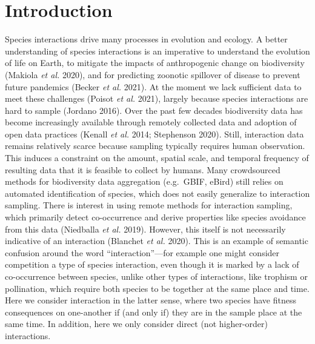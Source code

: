 \documentclass[11pt]{article}
\begin{document}
\vfill

\clearpage
\linenumbers
\pagestyle{normal}

\hypertarget{introduction}{%
\section{Introduction}\label{introduction}}

Species interactions drive many processes in evolution and ecology. A
better understanding of species interactions is an imperative to
understand the evolution of life on Earth, to mitigate the impacts of
anthropogenic change on biodiversity (Makiola \emph{et al.} 2020), and
for predicting zoonotic spillover of disease to prevent future pandemics
(Becker \emph{et al.} 2021). At the moment we lack sufficient data to
meet these challenges (Poisot \emph{et al.} 2021), largely because
species interactions are hard to sample (Jordano 2016). Over the past
few decades biodiversity data has become increasingly available through
remotely collected data and adoption of open data practices (Kenall
\emph{et al.} 2014; Stephenson 2020). Still, interaction data remains
relatively scarce because sampling typically requires human observation.
This induces a constraint on the amount, spatial scale, and temporal
frequency of resulting data that it is feasible to collect by humans.
Many crowdsourced methods for biodiversity data aggregation (e.g.~GBIF,
eBird) still relies on automated identification of species, which does
not easily generalize to interaction sampling. There is interest in
using remote methods for interaction sampling, which primarily detect
co-occurrence and derive properties like species avoidance from this
data (Niedballa \emph{et al.} 2019). However, this itself is not
necessarily indicative of an interaction (Blanchet \emph{et al.} 2020).
This is an example of semantic confusion around the word
``interaction''---for example one might consider competition a type of
species interaction, even though it is marked by a lack of co-occurrence
between species, unlike other types of interactions, like trophism or
pollination, which require both species to be together at the same place
and time. Here we consider interaction in the latter sense, where two
species have fitness consequences on one-another if (and only if) they
are in the sample place at the same time. In addition, here we only
consider direct (not higher-order) interactions.
\end{document}
